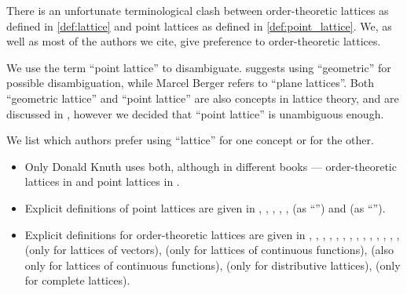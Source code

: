 \begin{remark}\label{rem:lattice_terminology}
  There is an unfortunate terminological clash between order-theoretic lattices as defined in \cref{def:lattice} and point lattices as defined in \cref{def:point_lattice}. We, as well as most of the authors we cite, give preference to order-theoretic lattices.

  We use the term \enquote{point lattice} to disambiguate. \Textcite[356]{Gruber2007ConvexAndDiscreteGeometry} suggests using \enquote{geometric} for possible disambiguation, while Marcel Berger refers to \enquote{plane lattices}. Both \enquote{geometric lattice} and \enquote{point lattice} are also concepts in lattice theory, and are discussed in \cite[80]{Birkhoff1967LatticeTheory}, however we decided that \enquote{point lattice} is unambiguous enough.

  We list which authors prefer using \enquote{lattice} for one concept or for the other.
  \begin{itemize}
    \item Only Donald Knuth uses both, although in different books --- order-theoretic lattices in \cite[exerc. 2.3.2.19]{Knuth1997ArtVol2} and point lattices in \cite[97]{Knuth1997ArtVol2}.

    \item Explicit definitions of point lattices are given in
    \cite[\S I.2]{Cassels1997NumberGeometry},
    \cite[\S 9.14.29]{Berger1987GeometryI},
    \cite[28]{GrünbaumShephard1987TilingsAndPatterns},
    \cite[1]{Rogers1964PackingAndCovering},
    \cite[356]{Gruber2007ConvexAndDiscreteGeometry},
    \cite[376]{Винберг2014КурсАлгебры} (as \enquote{}) and
    \cite[155]{Шафаревич2019ОсновныеПонятияАлгебры} (as \enquote{}).

    \item Explicit definitions for order-theoretic lattices are given in
    \cite[6]{Birkhoff1967LatticeTheory},
    \cite[9]{Grätzer2011LatticeTheory},
    \cite[def. 1.6.14]{Harzheim2005OrderedSets},
    \cite[def. 2.4]{DaveyPriestley2002LatticeTheory},
    \cite[40]{HalmosGivant2009BooleanAlgebras},
    \cite[3]{Johnstone1982StoneSpaces},
    \cite[80]{Kelley1975GeneralTopology},
    \cite[145]{Bourbaki2004TheoryOfSets},
    \cite[exerc. VI.2.1]{MacLane1998CategoryTheory},
    \cite[248]{Stanley2012EnumerativeCombinatoricsVol1},
    \cite[192]{Carothers2000RealAnalysis},
    \cite[3]{HillePhillips1996FunctionalAnalysis},
    \cite[210]{Rotman2015AdvancedModernAlgebraPart1},
    \cite[def. 8.2]{Jacobson1985BasicAlgebraI},
    \cite[227]{Cohn2013MeasureTheory} (only for lattices of vectors),
    \cite[def. 6.5.1]{Bobrowski2005FunctionalAnalysis} (only for lattices of continuous functions),
    \cite[174]{GelbaumOlmsted2003CounterexamplesInAnalysis} (also only for lattices of continuous functions),
    \cite[46]{CitkinMuravitsky2022ConsequenceRelations} (only for distributive lattices),
    \cite[10]{Barendregt1984LambdaCalculus} (only for complete lattices).


\end{itemize}
\end{remark}
